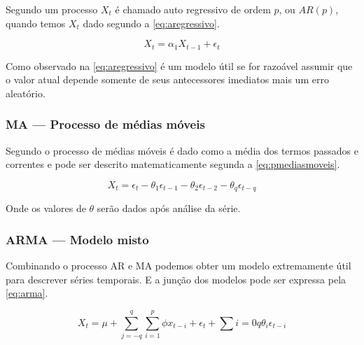 \documentclass[
    12pt,
    oneside,
    a4paper,
    english,
    brazil
]{abntex2}
\begin{document}

Segundo    um  processo  $X_t$  é  chamado  auto  regressivo
de   ordem   $p$,   ou   $AR(p)$,   quando   temos   $X_t$   dado   segundo   a
\autoref{eq:aregressivo}.

\begin{equation}
    \label{eq:aregressivo}
    X_t = \alpha_1X_{t-1}+\epsilon_t
\end{equation}

Como observado  na \autoref{eq:aregressivo}  é um modelo  útil se  for razoável
assumir que o  valor atual depende somente de seus  antecessores imediatos mais
um erro aleatório.

\subsubsection{MA --- Processo de médias móveis}


Segundo  o processo de  médias móveis é dado como
a média  dos termos passados  e correntes  e pode ser  descrito matematicamente
segunda a \autoref{eq:pmediasmoveis}.

\begin{equation}
    \label{eq:pmediasmoveis}
    X_t = \epsilon_t - \theta_1\epsilon_{t-1} - \theta_2\epsilon_{t-2} - \theta_{q}\epsilon_{t-q}
\end{equation}

Onde os valores de $\theta$ serão dados após análise da série.

\subsubsection{ARMA --- Modelo misto}

Combinando o  processo AR e MA  podemos obter um modelo  extremamente útil para
descrever  séries temporais.  E a  junção dos  modelos pode  ser expressa  pela
\autoref{eq:arma}.

\begin{equation}
    \label{eq:arma}
    X_t = \mu + \sum_{j=-q}^{q}\sum_{i = 1}^{p} \phi{}x_{t-i}+\epsilon_t+\sum{i = 0}{q}\theta_i\epsilon_{t-i}
\end{equation}
\end{document}
